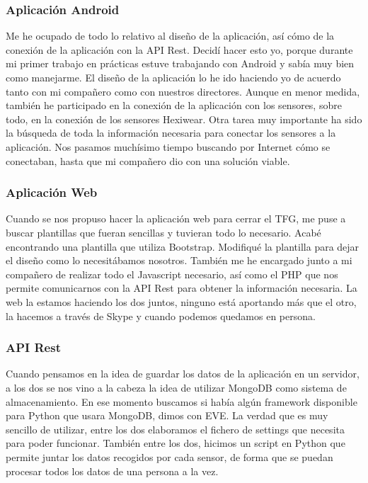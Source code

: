 \documentclass[11pt,spanish]{article}
\begin{document}
\subsubsection{Aplicación Android} 
Me he ocupado de todo lo relativo al diseño de la aplicación, así cómo de la conexión de la aplicación con la API Rest. Decidí hacer esto yo, porque durante mi primer trabajo en prácticas estuve trabajando con Android y sabía muy bien como manejarme. El diseño de la aplicación lo he ido haciendo yo de acuerdo tanto con mi compañero como con nuestros directores. Aunque en menor medida, también he participado en la conexión de la aplicación con los sensores, sobre todo, en la conexión de los sensores Hexiwear. Otra tarea muy importante ha sido la búsqueda de toda la información necesaria para conectar los sensores a la aplicación. Nos pasamos muchísimo tiempo buscando por Internet cómo se conectaban, hasta que mi compañero dio con una solución viable.
    
\subsubsection{Aplicación Web} 
Cuando se nos propuso hacer la aplicación web para cerrar el TFG, me puse a buscar plantillas que fueran sencillas y tuvieran todo lo necesario. Acabé encontrando una plantilla que utiliza Bootstrap. Modifiqué la plantilla para dejar el diseño como lo necesitábamos nosotros. También me he encargado junto a mi compañero de realizar todo el Javascript necesario, así como el PHP que nos permite comunicarnos con la API Rest para obtener la información necesaria. La web la estamos haciendo los dos juntos, ninguno está aportando más que el otro, la hacemos a través de Skype y cuando podemos quedamos en persona.

\subsubsection{API Rest} 
Cuando pensamos en la idea de guardar los datos de la aplicación en un servidor, a los dos se nos vino a la cabeza la idea de utilizar MongoDB como sistema de almacenamiento. En ese momento buscamos si había algún framework disponible para Python que usara MongoDB, dimos con EVE. La verdad que es muy sencillo de utilizar, entre los dos elaboramos el fichero de settings que necesita para poder funcionar. También entre los dos, hicimos un script en Python que permite juntar los datos recogidos por cada sensor, de forma que se puedan procesar todos los datos de una persona a la vez.
\end{document}

